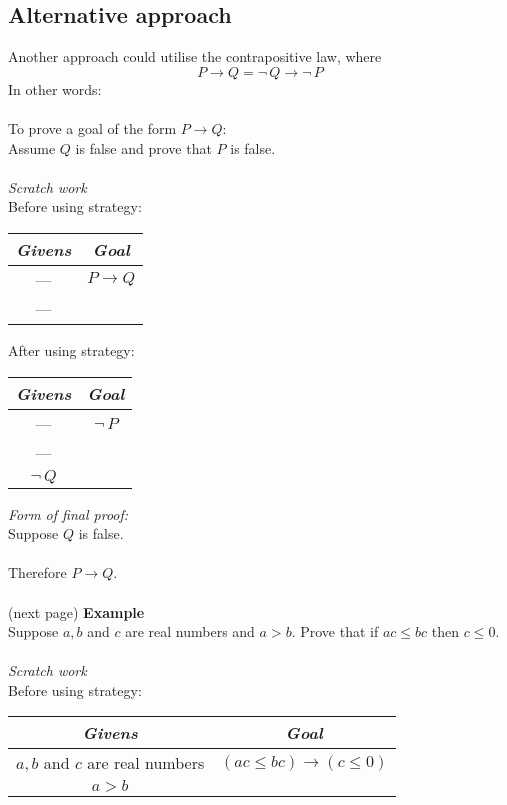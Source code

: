\documentclass{report}
\theoremstyle{definition}
\begin{document}
\subsection{Alternative approach}
Another approach could utilise the contrapositive law, where 
\begin{equation*}
P\to Q=\neg\,Q\to\neg\,P
\end{equation*}
In other words:\\
\vspace{1mm}\\
\indent To prove a goal of the form $P\to Q$:\\
\indent Assume $Q$ is false and prove that $P$ is false.\\
\vspace{1mm}\\
\textit{Scratch work}\\
Before using strategy:
\begin{center}
\begin{tabular}{c|c}
\textit{Givens}&\textit{Goal}\\
\hline
---&$P\to Q$\\
---&
\end{tabular}
\end{center}
After using strategy:
\begin{center}
\begin{tabular}{c|c}
\textit{Givens}&\textit{Goal}\\
\hline
---&$\neg\,P$\\
---&\\
$\neg\,Q$&
\end{tabular}
\end{center}
\textit{Form of final proof:}\\
\indent Suppose $Q$ is false.\\
\indent{}\\
\indent Therefore $P\to Q$.\\
\vspace{1mm}\\
(next page)\newpage
\noindent\textbf{Example}\\
Suppose $a,b$ and $c$ are real numbers and $a>b$. Prove that if $ac\leq bc$ then $c\leq0$.\\
\vspace{1mm}\\
\textit{Scratch work}\\
Before using strategy:
\begin{center}
\begin{tabular}{c|c}
\textit{Givens}&\textit{Goal}\\
\hline
$a,b$ and $c$ are real numbers&$(ac\leq bc)\to(c\leq0)$\\
$a>b$&
\end{tabular}
\end{center}
\end{document}
